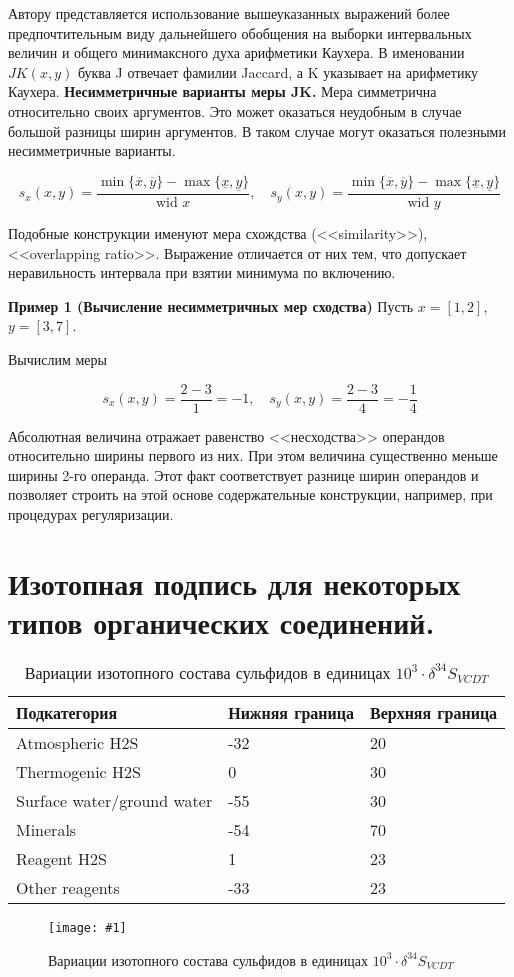 \documentclass[a4paper,12pt]{article}
\newcommand{\plot}[3]{
    \begin{figure}[H]
        \begin{center}
            \texttt{[image: \#1]}
            \caption{#2}
            \label{#3}
        \end{center}
    \end{figure}
}
\begin{document}
    Автору представляется использование вышеуказанных выражений более предпочтительным виду дальнейшего обобщения на выборки интервальных величин и общего минимаксного духа арифметики Каухера.
    В именовании \(JK(x, y)\) буква J отвечает фамилии Jaccard, а K указывает на арифметику Каухера.
    \textbf{Несимметричные варианты меры JK.} Мера симметрична относительно своих аргументов.
    Это может оказаться неудобным в случае большой разницы ширин аргументов. В таком случае могут оказаться полезными несимметричные варианты.

    \[
    s_x(x, y) = \frac{\min\{\overline{x}, \overline{y}\} - \max\{\underline{x}, \underline{y}\}}{\text{wid } x}, \quad s_y(x, y) = \frac{\min\{\overline{x}, \overline{y}\} - \max\{\underline{x}, \underline{y}\}}{\text{wid } y}
    \]

    Подобные конструкции именуют мера схождства (<<similarity>>), <<overlapping ratio>>.
    Выражение отличается от них тем, что допускает неравильность интервала при взятии минимума по включению.

    \textbf{Пример 1 (Вычисление несимметричных мер сходства)} Пусть \( x = [1, 2] \), \( y = [3, 7] \).

    Вычислим меры

    \[
    s_x(x, y) = \frac{2 - 3}{1} = -1, \quad s_y(x, y) = \frac{2 - 3}{4} = -\frac{1}{4}
    \]

    Абсолютная величина отражает равенство <<несходства>> операндов относительно ширины первого из них. При этом величина существенно меньше ширины 2-го операнда.
    Этот факт соответствует разнице ширин операндов и позволяет строить на этой основе содержательные конструкции, например, при процедурах регуляризации.

    \section{Изотопная подпись для некоторых типов органических соединений.}\label{sec:------.}

    \begin{table}[h]
    \centering
    \caption{Вариации изотопного состава сульфидов в единицах \(10^3 \cdot \delta^{34}S_{VCDT}\)}
    \label{tab:sulfide}
    \begin{tabular}{|l|l|l|}
    \hline
    Подкатегория & Нижняя граница & Верхняя граница \\
    \hline
    Atmospheric H2S & -32 & 20 \\
    \hline
    Thermogenic H2S & 0 & 30 \\
    \hline
    Surface water/ground water & -55 & 30 \\
    \hline
    Minerals & -54 & 70 \\
    \hline
    Reagent H2S & 1 & 23 \\
    \hline
    Other reagents & -33 & 23 \\
    \hline
    \end{tabular}
    \end{table}
    \plot{sulfide_intervals}{Вариации изотопного состава сульфидов в единицах \(10^3 \cdot \delta^{34}S_{VCDT}\)}{p:sulfide_interv}
\end{document}
